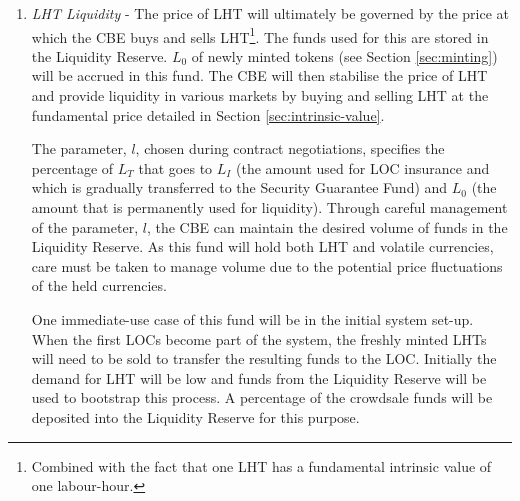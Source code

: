 \begin{multicols}{2}
\begin{enumerate}
  The mitigation reserve, $L_I$ is not constant, but is gradually transferred to the SGF (Section \ref{sec:insurance}). The rate at which this fund is transferred is derived from the parameter, $M$, which specifies the total number of months until the funds are entirely transferred, and is negotiated during the minting process. The mitigation reserve funds will be transferred monthly at a uniform rate ($L_I/M$).  

  This procedure then allows the CBE to statistically choose $\rho$, $L_T$ and $M$ given the risk profile and reputation of any given LOC during the minting process. For example, $\rho$, $L_T$ and $M$ can be designed such that within a 95 percent confidence interval, an LOC does not lose more than $(\rho - \zeta)$ worth of the labour-hours promised over a given time\footnote{This can occur because the holdings of an LOC increase over time due to assumed external investment.}. Here $\zeta$ is a number that quantifies the risk that the LOC is willing to accept. This degree of freedom allows the CBE to manage LOCs of varying risk profiles. 

\item \textit{LHT Liquidity} - The price of LHT will ultimately be governed by the price at which the CBE buys and sells LHT\footnote{Combined with the fact that one LHT has a fundamental intrinsic value of one labour-hour.}. The funds used for this are stored in the Liquidity Reserve. $L_0$ of newly minted tokens (see Section \ref{sec:minting}) will be accrued in this fund. The CBE will then stabilise the price of LHT and provide liquidity in various markets by buying and selling LHT at the fundamental price detailed in Section \ref{sec:intrinsic-value}. 

The parameter, $l$, chosen during contract negotiations, specifies the percentage of $L_T$ that goes to $L_I$ (the amount used for LOC insurance and which is gradually transferred to the Security Guarantee Fund) and $L_0$ (the amount that is permanently used for liquidity). Through careful management of the parameter, $l$, the CBE can maintain the desired volume of funds in the Liquidity Reserve. As this fund will hold both LHT and volatile currencies, care must be taken to manage volume due to the potential price fluctuations of the held currencies. 

One immediate-use case of this fund will be in the initial system set-up. When the first LOCs become part of the system, the freshly minted LHTs will need to be sold to transfer the resulting funds to the LOC. Initially the demand for LHT will be low and funds from the Liquidity Reserve will be used to bootstrap this process. A percentage of the crowdsale funds will be deposited into the Liquidity Reserve for this purpose.
\end{enumerate}



\end{multicols}
